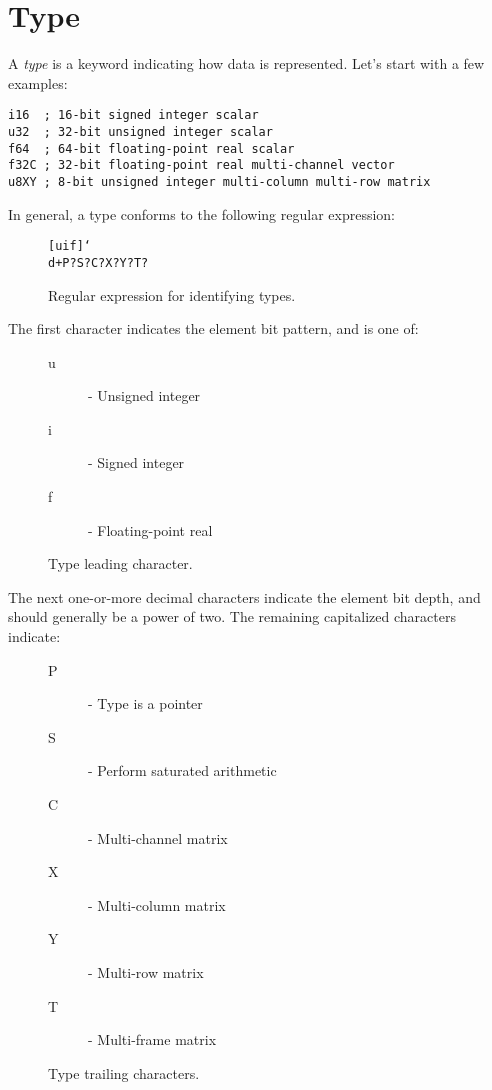 \documentclass[twoside=false, numbers=noenddot]{scrbook}
\newcommand{\dindex}[1]{\emph{#1}\index{#1}}
\newcommand{\pindex}[1]{#1\index{#1}}
\begin{document}
\section{Type}
\label{sec:type}
A \dindex{type} is a keyword indicating how data is represented.
Let's start with a few examples:

\begin{verbatim}
i16  ; 16-bit signed integer scalar
u32  ; 32-bit unsigned integer scalar
f64  ; 64-bit floating-point real scalar
f32C ; 32-bit floating-point real multi-channel vector
u8XY ; 8-bit unsigned integer multi-column multi-row matrix
\end{verbatim}

In general, a \pindex{type} conforms to the following regular expression:

\begin{figure}[h]
\centering
\texttt{[uif]\char`\\ d+P?S?C?X?Y?T?}
\caption{Regular expression for identifying types.}
\end{figure}

The first character indicates the element bit pattern, and is one of:

\begin{figure}[h]
\begin{description}
\item[u] - Unsigned integer
\item[i] - Signed integer
\item[f] - Floating-point real
\end{description}
\caption{Type leading character.}
\end{figure}

The next one-or-more decimal characters indicate the element bit depth, and should generally be a power of two.
The remaining capitalized characters indicate:

\begin{figure}[h]
\begin{description}
\item[P] - Type is a pointer
\item[S] - Perform saturated arithmetic
\item[C] - Multi-channel matrix
\item[X] - Multi-column matrix
\item[Y] - Multi-row matrix
\item[T] - Multi-frame matrix
\end{description}
\caption{Type trailing characters.}
\end{figure}
\end{document}
